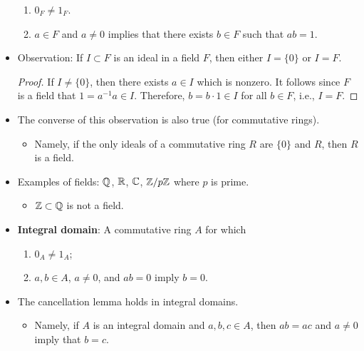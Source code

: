 \documentclass[../notes.tex]{subfiles}
\begin{document}
\begin{itemize}
\begin{enumerate}[label={(\roman*)}]
        \item $0_F\neq 1_F$.
        \item $a\in F$ and $a\neq 0$ implies that there exists $b\in F$ such that $ab=1$.
    \end{enumerate}
    \item Observation: If $I\subset F$ is an ideal in a field $F$, then either $I=\{0\}$ or $I=F$.
    \begin{proof}
        If $I\neq\{0\}$, then there exists $a\in I$ which is nonzero. It follows since $F$ is a field that $1=a^{-1}a\in I$. Therefore, $b=b\cdot 1\in I$ for all $b\in F$, i.e., $I=F$.
    \end{proof}
    \item The converse of this observation is also true (for commutative rings).
    \begin{itemize}
        \item Namely, if the only ideals of a commutative ring $R$ are $\{0\}$ and $R$, then $R$ is a field.
    \end{itemize}
    \item Examples of fields: $\mathbb{Q}$, $\mathbb{R}$, $\mathbb{C}$, $\mathbb{Z}/p\mathbb{Z}$ where $p$ is prime.
    \begin{itemize}
        \item $\mathbb{Z}\subset\mathbb{Q}$ is not a field.
    \end{itemize}
    \item \textbf{Integral domain}: A commutative ring $A$ for which
    \begin{enumerate}
        \item $0_A\neq 1_A$;
        \item $a,b\in A$, $a\neq 0$, and $ab=0$ imply $b=0$.
    \end{enumerate}
    \item The cancellation lemma holds in integral domains.
    \begin{itemize}
        \item Namely, if $A$ is an integral domain and $a,b,c\in A$, then $ab=ac$ and $a\neq 0$ imply that $b=c$.
    \end{itemize}
\end{itemize}
\end{document}

